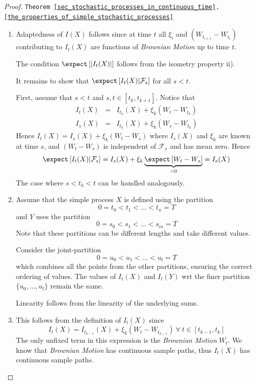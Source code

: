 \documentclass[11pt,a4paper]{article}
\begin{document}
\begin{proof}{\texttt{Theorem \ref{sec_stochastic_processes_in_continuous_time}.\ref{the_properties_of_simple_stochastic_processes}}}
\begin{enumerate}
      \item Adaptedness of $I(X)$ follows since at time $t$ all $\xi_i$ and $(W_{t_{i+1}}-W_{t_i})$ contributing to $I_t(X)$ are functions of \textit{Brownian Motion} up to time $t$.
      \par The condition $\expect\left[\left|I_t(X)\right|\right]$ follows from the isometry property ii).
      \par It remains to show that $\expect\left[I_t(X)|\mathcal{F}_s\right]$ for all $s<t$.
      \par First, assume that $s<t$ and $s,t\in[t_k,t_{k+1}]$. Notice that
      \[\begin{array}{rcl}
        I_t(X)&=&I_{t_k}(X)+\xi_k(W_t-W_{t_k})\\
        I_s(X)&=&I_{t_k}(X)+\xi_k(W_s-W_{t_k})
      \end{array}\]
      Hence $I_t(X)=I_s(X)+\xi_k(W_t-W_s)$ where $I_s(X)$ and $\xi_k$ are known at time $s$, and $(W_t-W_s)$ is independent of $\mathcal{F}_s$ and has mean zero. Hence
      \[ \expect\left[I_t(X)|\mathcal{F}_s\right]=I_s(X)+\xi_k\underbrace{\expect\left[W_t-W_s\right]}_{=0}=I_s(X) \]
      The case where $s<t_k<t$ can be handled analogously.

      \item Assume that the simple process $X$ is defined using the partition
      \[ 0=t_0<t_1<\dots<t_n=T \]
      and $Y$ uses the partition
      \[ 0=s_0<s_1<\dots<s_m=T \]
      Note that these partitions can be different lengths and take different values.
      \par Consider the joint-partition
      \[ 0=u_0<u_1<\dots<u_l=T \]
      which combines all the points from the other partitions, ensuring the correct ordering of values. The values of $I_t(X)$ and $I_t(Y)$ wrt the finer partition $\{u_0,\dots,u_l\}$ remain the same.
      \par Linearity follows from the linearity of the underlying sums.

      \item This follows from the definition of $I_t(X)$ since
      \[ I_t(X)=I_{t_{k-1}}(X)+\xi_k(W_t-W_{t_{k-1}})\ \forall\ t\in[t_{k-1},t_k] \]
      The only unfixed term in this expression is the \textit{Brownian Motion} $W_t$. We know that \textit{Brownian Motion} has continuous sample paths, thus $I_t(X)$ has continuous sample paths.
    \end{enumerate}
  \end{proof}
\end{document}

